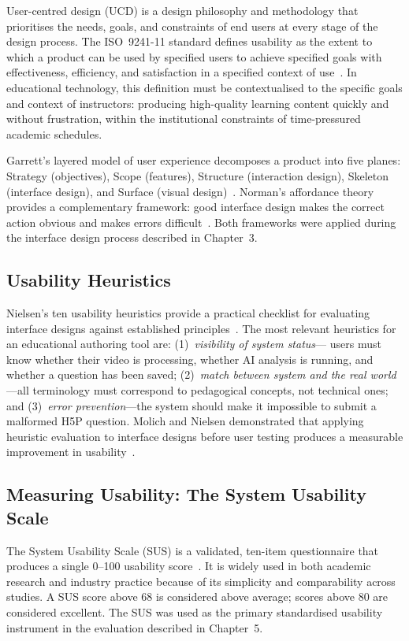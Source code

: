 User-centred design (UCD) is a design philosophy and methodology that
prioritises the needs, goals, and constraints of end users at every stage of
the design process. The ISO~9241-11 standard defines usability as the
extent to which a product can be used by specified users to achieve
specified goals with effectiveness, efficiency, and satisfaction in a
specified context of use~\cite{iso9241}. In educational technology, this
definition must be contextualised to the specific goals and context of
instructors: producing high-quality learning content quickly and without
frustration, within the institutional constraints of time-pressured
academic schedules.

Garrett's layered model of user experience decomposes a product into five
planes: Strategy (objectives), Scope (features), Structure (interaction
design), Skeleton (interface design), and Surface (visual
design)~\cite{garrett2010}. Norman's affordance theory provides a
complementary framework: good interface design makes the correct action
obvious and makes errors difficult~\cite{norman1988}. Both frameworks were
applied during the interface design process described in Chapter~3.

\subsection{Usability Heuristics}

Nielsen's ten usability heuristics provide a practical checklist for
evaluating interface designs against established
principles~\cite{nielsen1994}. The most relevant heuristics for an
educational authoring tool are: (1)~\emph{visibility of system status}---
users must know whether their video is processing, whether AI analysis is
running, and whether a question has been saved; (2)~\emph{match between
system and the real world}---all terminology must correspond to pedagogical
concepts, not technical ones; and (3)~\emph{error prevention}---the system
should make it impossible to submit a malformed H5P question. Molich and
Nielsen demonstrated that applying heuristic evaluation to interface designs
before user testing produces a measurable improvement in
usability~\cite{molich1990}.

\subsection{Measuring Usability: The System Usability Scale}

The System Usability Scale (SUS) is a validated, ten-item questionnaire
that produces a single 0--100 usability score~\cite{brooke1996}. It is
widely used in both academic research and industry practice because of its
simplicity and comparability across studies. A SUS score above 68 is
considered above average; scores above 80 are considered excellent. The
SUS was used as the primary standardised usability instrument in the
evaluation described in Chapter~5.

